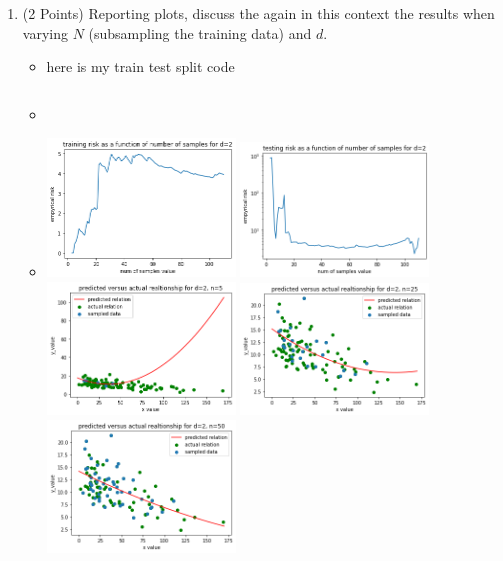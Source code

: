 \documentclass{article}
\begin{document}
\begin{enumerate}
\setcounter{enumi}{\value{saveenum}}
    \item (2 Points) Reporting plots, discuss the again in this context the results when varying $N$ (subsampling the training data) and $d$. 
\begin{itemize}
\item   here is my train test split code 
\item \inputminted[firstline=197, lastline=203, breaklines=True]{python}{hw1_code_source.py}

\\
    \item\includegraphics[width=5cm]{homework/homework_1/training_1.png}
    \includegraphics[width=5cm]{homework/homework_1/testing_1.png}
    \includegraphics[width=5cm]{homework/homework_1/1_1.png}
    \includegraphics[width=5cm]{homework/homework_1/1_2.png}
    \includegraphics[width=5cm]{homework/homework_1/1_3.png}

\end{itemize}
\end{enumerate}
\end{document}
